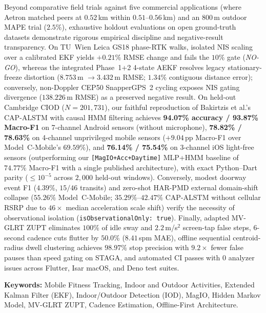 \documentclass[12pt,a4paper,oneside]{report}
\begin{document}
Beyond comparative field trials against five commercial applications (where Aetron matched peers at $0.52$\,km within $0.51$--$0.56$\,km) and an $800$\,m outdoor MAPE trial ($2.5\%$), exhaustive holdout evaluations on open ground-truth datasets demonstrate rigorous empirical discipline and negative-result transparency. On TU~Wien Leica GS18 phase-RTK walks, isolated NIS scaling over a calibrated EKF yields $+0.21\%$ RMSE change and fails the $10\%$ gate (\textit{NO-GO}), whereas the integrated Phase~1+2 4-state AEKF resolves legacy stationary-freeze distortion ($8.753$\,m $\to 3.432$\,m RMSE; $1.34\%$ contiguous distance error); conversely, non-Doppler CEP50 SnapperGPS~2 cycling exposes NIS gating divergence ($138.226$\,m RMSE) as a preserved negative result. On held-out Cambridge CIOD ($N=201{,}731$), our faithful reproduction of Bakirtzis et al.'s CAP-ALSTM with causal HMM filtering achieves \textbf{94.07\% accuracy / 93.87\% Macro-F1} on 7-channel Android sensors (without microphone), \textbf{78.82\% / 78.63\%} on 4-channel unprivileged mobile sensors ($+9.04$\,pp Macro-F1 over Model~C-Mobile's $69.59\%$), and \textbf{76.14\% / 75.54\%} on 3-channel iOS light-free sensors (outperforming our \texttt{[MagIO+Acc+Daytime]} MLP+HMM baseline of $74.77\%$ Macro-F1 with a single published architecture), with exact Python--Dart parity ($\le 10^{-5}$ across $2{,}000$ held-out windows). Conversely, modest doorway event F1 ($4.39\%$, $15/46$ transits) and zero-shot HAR-PMD external domain-shift collapse ($55.26\%$ Model~C-Mobile; $35.29\%$--$42.47\%$ CAP-ALSTM without cellular RSRP due to $46\times$ median acceleration scale shift) verify the necessity of observational isolation (\texttt{isObservationalOnly: true}). Finally, adapted MV-GLRT ZUPT eliminates $100\%$ of idle sway and $2.2$\,m/s$^2$ screen-tap false steps, 6-second cadence cuts flutter by $50.0\%$ ($8.41$\,spm MAE), offline sequential centroid-radius dwell clustering achieves $98.97\%$ stop precision with $9.2\times$ fewer false pauses than speed gating on STAGA, and automated CI passes with $0$ analyzer issues across Flutter, Isar macOS, and Deno test suites.

\vspace{0.6cm}
\noindent\textbf{Keywords:} Mobile Fitness Tracking, Indoor and Outdoor Activities, Extended Kalman Filter (EKF), Indoor/Outdoor Detection (IOD), MagIO, Hidden Markov Model, MV-GLRT ZUPT, Cadence Estimation, Offline-First Architecture.

\clearpage







\clearpage
{}


\end{document}

